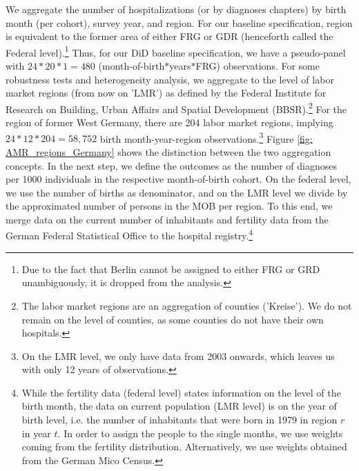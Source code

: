 \documentclass[11pt, a4paper,draft]{article} %
\begin{document}
We aggregate the number of hospitalizations (or by diagnoses chapters) by birth month (per cohort), survey year, and region. For our baseline specification, region is equivalent to the former area of either FRG or GDR (henceforth called the Federal level).\footnote{Due to the fact that Berlin cannot be assigned to either FRG or GRD unambiguously, it is dropped from the analysis.} Thus, for our DiD baseline specification, we have a pseudo-panel with $24*20*1=480$ (month-of-birth$*$years$*$FRG) observations. For some robustness tests and heterogeneity analysis, we aggregate to the level of labor market regions (from now on 'LMR') as defined by the Federal Institute  for Research on Building, Urban Affairs and Spatial Development (BBSR).\footnote{The labor market regions are an aggregation of counties ('Kreise'). We do not remain on the level of counties, as some counties do not have their own hospitals.} For the region of former West Germany, there are 204 labor market regions, implying $24*12*204= 58,752$ birth month-year-region observations.\footnote{On the LMR level, we only have data from 2003 onwards, which leaves us with only 12 years of observations.} Figure \ref{fig: AMR_regions_Germany} shows the distinction between the two aggregation concepts. \newline %
In the next step, we define the outcomes as the number of diagnoses per 1000 individuals in the respective month-of-birth cohort. On the federal level, we use the number of births as denominator, and on the LMR level we divide by the approximated number of persons in the MOB per region. To this end, we merge data on the current number of inhabitants and fertility data from the German Federal Statistical Office to the hospital registry.\footnote{While the fertility data (federal level) states information on the level of the birth month, the data on current population (LMR level) is on the year of birth level, i.e. the number of inhabitants that were born in 1979 in region $r$ in year $t$. In order to assign the people to the single months, we use weights coming from the fertility distribution. Alternatively, we use weights obtained from the German Mico Census.}\newline


\end{document}
